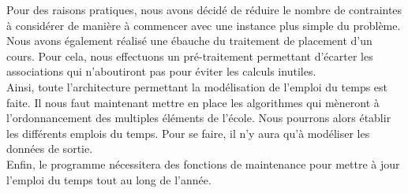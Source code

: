 \documentclass[12pt,a4paper,french]{article}
\begin{document}
Pour des raisons pratiques, nous avons décidé de réduire le nombre de contraintes à considérer de manière à commencer avec une instance plus simple du problème.\\

Nous avons également réalisé une ébauche du traitement de placement d'un cours. Pour cela, nous effectuons un pré-traitement permettant d'écarter les associations qui n'aboutiront pas pour éviter les calculs inutiles.\\

Ainsi, toute l'architecture permettant la modélisation de l'emploi du temps est faite. Il nous faut maintenant mettre en place les algorithmes qui mèneront à l'ordonnancement des multiples éléments de l'école. Nous pourrons alors établir les différents emplois du temps. Pour se faire, il n'y aura qu'à modéliser les données de sortie.\\

Enfin, le programme nécessitera des fonctions de maintenance pour mettre à jour l'emploi du temps tout au long de l'année.


\newpage
{}
\listoffigures

\newpage


\end{document}
